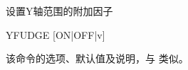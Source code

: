 \label{cmd:yfudge}

设置Y轴范围的附加因子

\begin{SACSTX}
YFUDGE [ON|OFF|v]
\end{SACSTX}

该命令的选项、默认值及说明，与  类似。
